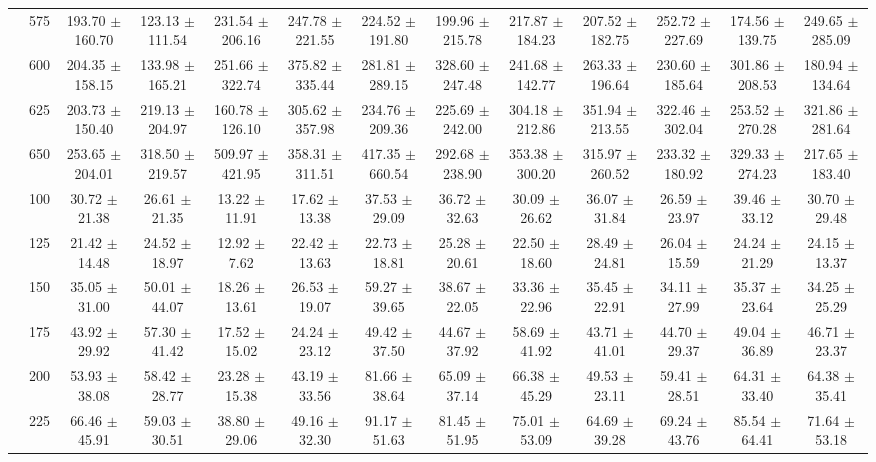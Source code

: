 \begin{table}[h]
{\begin{tabular}{
        ccccccccccccc}
 & 575& 193.70 $\pm$ 160.70& 123.13 $\pm$ 111.54& 231.54 $\pm$ 206.16& 247.78 $\pm$ 221.55& 224.52 $\pm$ 191.80& 199.96 $\pm$ 215.78& 217.87 $\pm$ 184.23& 207.52 $\pm$ 182.75& 252.72 $\pm$ 227.69& 174.56 $\pm$ 139.75& 249.65 $\pm$ 285.09 \\ 
 & 600& 204.35 $\pm$ 158.15& 133.98 $\pm$ 165.21& 251.66 $\pm$ 322.74& 375.82 $\pm$ 335.44& 281.81 $\pm$ 289.15& 328.60 $\pm$ 247.48& 241.68 $\pm$ 142.77& 263.33 $\pm$ 196.64& 230.60 $\pm$ 185.64& 301.86 $\pm$ 208.53& 180.94 $\pm$ 134.64 \\ 
 & 625& 203.73 $\pm$ 150.40& 219.13 $\pm$ 204.97& 160.78 $\pm$ 126.10& 305.62 $\pm$ 357.98& 234.76 $\pm$ 209.36& 225.69 $\pm$ 242.00& 304.18 $\pm$ 212.86& 351.94 $\pm$ 213.55& 322.46 $\pm$ 302.04& 253.52 $\pm$ 270.28& 321.86 $\pm$ 281.64 \\ 
 & 650& 253.65 $\pm$ 204.01& 318.50 $\pm$ 219.57& 509.97 $\pm$ 421.95& 358.31 $\pm$ 311.51& 417.35 $\pm$ 660.54& 292.68 $\pm$ 238.90& 353.38 $\pm$ 300.20& 315.97 $\pm$ 260.52& 233.32 $\pm$ 180.92& 329.33 $\pm$ 274.23& 217.65 $\pm$ 183.40 \\ \hline 
 & 100& 30.72 $\pm$ 21.38& 26.61 $\pm$ 21.35& 13.22 $\pm$ 11.91& 17.62 $\pm$ 13.38& 37.53 $\pm$ 29.09& 36.72 $\pm$ 32.63& 30.09 $\pm$ 26.62& 36.07 $\pm$ 31.84& 26.59 $\pm$ 23.97& 39.46 $\pm$ 33.12& 30.70 $\pm$ 29.48 \\ 
 & 125& 21.42 $\pm$ 14.48& 24.52 $\pm$ 18.97& 12.92 $\pm$ 7.62& 22.42 $\pm$ 13.63& 22.73 $\pm$ 18.81& 25.28 $\pm$ 20.61& 22.50 $\pm$ 18.60& 28.49 $\pm$ 24.81& 26.04 $\pm$ 15.59& 24.24 $\pm$ 21.29& 24.15 $\pm$ 13.37 \\ 
 & 150& 35.05 $\pm$ 31.00& 50.01 $\pm$ 44.07& 18.26 $\pm$ 13.61& 26.53 $\pm$ 19.07& 59.27 $\pm$ 39.65& 38.67 $\pm$ 22.05& 33.36 $\pm$ 22.96& 35.45 $\pm$ 22.91& 34.11 $\pm$ 27.99& 35.37 $\pm$ 23.64& 34.25 $\pm$ 25.29 \\ 
 & 175& 43.92 $\pm$ 29.92& 57.30 $\pm$ 41.42& 17.52 $\pm$ 15.02& 24.24 $\pm$ 23.12& 49.42 $\pm$ 37.50& 44.67 $\pm$ 37.92& 58.69 $\pm$ 41.92& 43.71 $\pm$ 41.01& 44.70 $\pm$ 29.37& 49.04 $\pm$ 36.89& 46.71 $\pm$ 23.37 \\ 
 & 200& 53.93 $\pm$ 38.08& 58.42 $\pm$ 28.77& 23.28 $\pm$ 15.38& 43.19 $\pm$ 33.56& 81.66 $\pm$ 38.64& 65.09 $\pm$ 37.14& 66.38 $\pm$ 45.29& 49.53 $\pm$ 23.11& 59.41 $\pm$ 28.51& 64.31 $\pm$ 33.40& 64.38 $\pm$ 35.41 \\ 
 & 225& 66.46 $\pm$ 45.91& 59.03 $\pm$ 30.51& 38.80 $\pm$ 29.06& 49.16 $\pm$ 32.30& 91.17 $\pm$ 51.63& 81.45 $\pm$ 51.95& 75.01 $\pm$ 53.09& 64.69 $\pm$ 39.28& 69.24 $\pm$ 43.76& 85.54 $\pm$ 64.41& 71.64 $\pm$ 53.18 \\ 

\end{tabular}}
\end{table}
